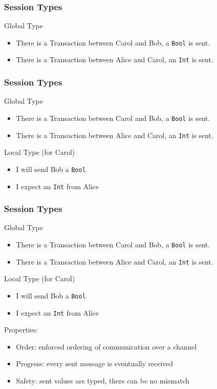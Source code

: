 \documentclass[12pt]{beamer}
\begin{document}
\begin{frame}[t]
\frametitle{Session Types}

Global Type

\begin{itemize}
    \item There is a Transaction between Carol and Bob, a \texttt{Bool} is sent.
    \item There is a Transaction between Alice and Carol, an \texttt{Int} is sent.
\end{itemize}

\end{frame}

\begin{frame}[t]
\frametitle{Session Types}

Global Type

\begin{itemize}
    \item There is a Transaction between Carol and Bob, a \texttt{Bool} is sent.
    \item There is a Transaction between Alice and Carol, an \texttt{Int} is sent.
\end{itemize}

Local Type (for Carol)

\begin{itemize}
    \item I will send Bob a \texttt{Bool}
    \item I expect an \texttt{Int} from Alice
\end{itemize}

\end{frame}

\begin{frame}[t]
\frametitle{Session Types}

Global Type

\begin{itemize}
    \item There is a Transaction between Carol and Bob, a \texttt{Bool} is sent.
    \item There is a Transaction between Alice and Carol, an \texttt{Int} is sent.
\end{itemize}

Local Type (for Carol)

\begin{itemize}
    \item I will send Bob a \texttt{Bool}
    \item I expect an \texttt{Int} from Alice
\end{itemize}

Properties: 
\begin{itemize}
    \item Order: enforced ordering of communication over a channel
    \item Progress: every sent message is eventually received
    \item Safety: sent values are typed, there can be no mismatch
\end{itemize}
\end{frame}
\end{document}
